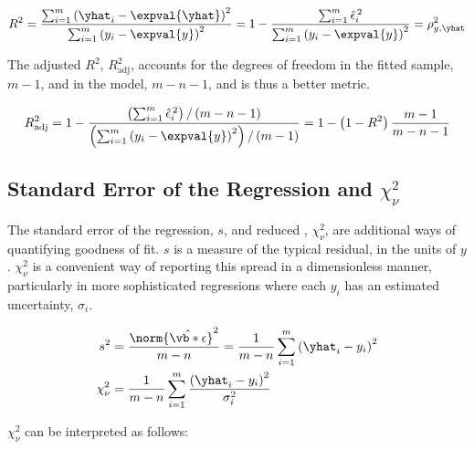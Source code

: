 \begin{equation}\label{eq:regression:goodness_of_fit:R2}
R^{2} = \frac{
\sum_{i=1}^{m} \left(\yhat_{i} - \expval{\yhat}\right)^{2}
}{
\sum_{i=1}^{m} \left(y_{i} - \expval{y}\right)^{2}
} = 1 - \frac{
\sum_{i=1}^{m} \hat{\epsilon}_{i}^{\,2}
}{
\sum_{i=1}^{m} \left(y_{i} - \expval{y}\right)^{2}
} = \rho_{y,\yhat}^{2}
\end{equation}

The adjusted $R^{2}$, $R^{2}_{\text{adj}}$, accounts for the degrees of freedom in the
fitted sample, $m-1$, and in the model, $m-n-1$, and is thus a better metric.

\begin{equation}\label{eq:regression:goodness_of_fit:R2_adj}
R^{2}_{\text{adj}} = 1 - \frac{
\left(\sum_{i=1}^{m} \hat{\epsilon}_{i}^{\,2}\right)/\left(m-n-1\right)
}{
\left(\sum_{i=1}^{m} \left(y_{i} - \expval{y}\right)^{2}\right)/\left(m-1\right)
}
= 1 - \left(1-R^{2}\right)\frac{m-1}{m-n-1}
\end{equation}

\subsection{Standard Error of the Regression and $\chi_{\nu}^{2}$}
\label{regression:goodness_of_fit:reduced_chi2}

The standard error of the regression, $s$,
and reduced \chiSqstat, $\chi_{\nu}^{2}$,
are additional ways of quantifying goodness of fit.
$s$ is a measure of the typical residual, in the units of $y$.
$\chi_{\nu}^{2}$ is a convenient way of reporting this spread in a dimensionless manner,
particularly in more sophisticated regressions where each $y_{i}$ has an \apriori estimated uncertainty, $\sigma_{i}$.

\begin{subequations}\label{eq:regression:goodness_of_fit:s_red_chi2}
\begin{align}
s^{2} &= \frac{\norm{\hat{\vb*{\epsilon}}}^{2}}{m-n} = \frac{1}{m-n} \sum_{i=1}^{m} \left(\yhat_{i} - y_{i}\right)^{2} \label{eq:regression:goodness_of_fit:s} \\
\chi_{\nu}^{2} &= \frac{1}{m-n} \sum_{i=1}^{m} \frac{\left(\yhat_{i} - y_{i}\right)^{2}}{\sigma_{i}^{2}} \label{eq:regression:goodness_of_fit:red_chi2}
\end{align}
\end{subequations}

$\chi_{\nu}^{2}$ can be interpreted as follows:

